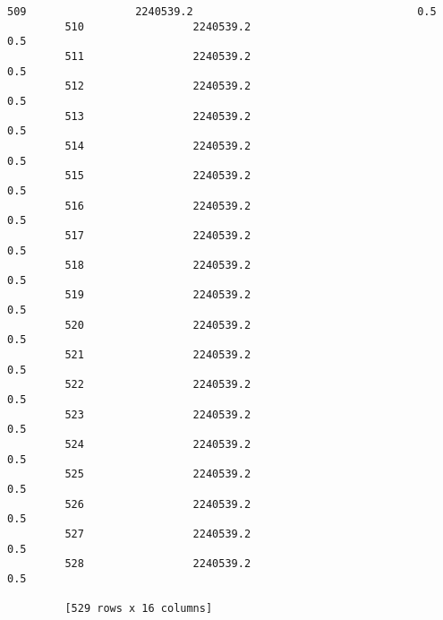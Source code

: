 \documentclass{article}
\begin{document}
\begin{Verbatim}[commandchars=\\\{\}]
         509                 2240539.2                                   0.5  
         510                 2240539.2                                   0.5  
         511                 2240539.2                                   0.5  
         512                 2240539.2                                   0.5  
         513                 2240539.2                                   0.5  
         514                 2240539.2                                   0.5  
         515                 2240539.2                                   0.5  
         516                 2240539.2                                   0.5  
         517                 2240539.2                                   0.5  
         518                 2240539.2                                   0.5  
         519                 2240539.2                                   0.5  
         520                 2240539.2                                   0.5  
         521                 2240539.2                                   0.5  
         522                 2240539.2                                   0.5  
         523                 2240539.2                                   0.5  
         524                 2240539.2                                   0.5  
         525                 2240539.2                                   0.5  
         526                 2240539.2                                   0.5  
         527                 2240539.2                                   0.5  
         528                 2240539.2                                   0.5  
         
         [529 rows x 16 columns]
\end{Verbatim}
        
\end{document}

